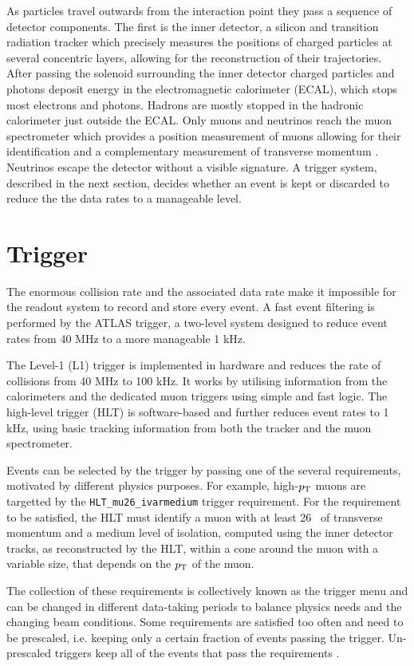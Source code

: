 As particles travel outwards from the interaction point they pass a
sequence of detector components. The first is the inner detector,
a silicon and transition radiation tracker which precisely measures the
positions of charged particles at several concentric layers, allowing for
the reconstruction of their trajectories. After passing the solenoid
surrounding the inner detector charged particles and photons deposit
energy in the electromagnetic calorimeter (ECAL), which stops most electrons
and photons. Hadrons are mostly stopped in the hadronic calorimeter
just outside the ECAL. Only muons and neutrinos reach the muon spectrometer
which provides a position measurement of muons allowing for their
identification and a complementary measurement of transverse momentum
\cite{Aad:2008zzm}. Neutrinos escape the detector without a visible
signature. A trigger system, described in the next section,
decides whether an event is kept or discarded to reduce the the data
rates to a manageable level.

\section{Trigger}

The enormous collision rate and the associated data rate make it
impossible for the readout system to record and store every event. A fast
event filtering is performed by the ATLAS trigger, a two-level system
designed to reduce event rates from 40 MHz to a more manageable 1 kHz.

The Level-1 (L1) trigger is implemented in hardware and reduces the rate of
collisions from 40 MHz to 100 kHz. It works by utilising information
from the calorimeters and the dedicated muon triggers using simple
and fast logic. The high-level trigger (HLT) is software-based and further
reduces event rates to 1 kHz, using basic tracking information from both
the tracker and the muon spectrometer.

Events can be selected by the trigger by passing one of the several
requirements, motivated by different physics purposes. For example,
high-$p_{\text{T}}$ muons are targetted by the \texttt{HLT\_mu26\_ivarmedium} trigger
requirement. For the requirement to be satisfied, the HLT
must identify a muon with at least 26 \GeV~of transverse momentum and
a medium level of isolation, computed using the inner detector tracks,
as reconstructed by the HLT, within a cone around the muon with a variable
size, that depends on the $p_{\text{T}}$ of the muon.

The collection
of these requirements is collectively known as the trigger menu and can
be changed in different data-taking periods to balance physics needs
and the changing beam conditions. Some requirements are satisfied too
often and need to be prescaled, i.e. keeping only a certain fraction of events
passing the trigger. Un-prescaled triggers keep all of the events that
pass the requirements \cite{Aaboud:2016leb}.

